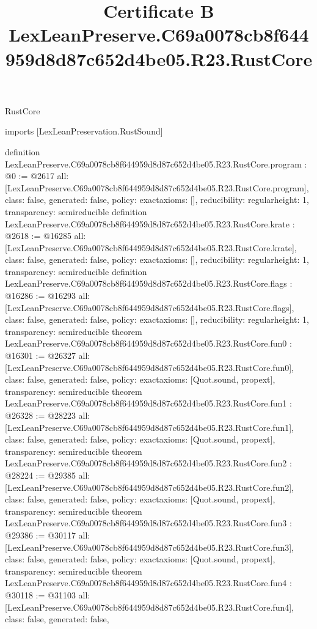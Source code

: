 \begin{lexlean}{RustCore}
\title{Certificate B LexLeanPreserve.C69a0078cb8f644959d8d87c652d4be05.R23.RustCore}
\begin{coremodule}
imports [LexLeanPreservation.RustSound]

definition LexLeanPreserve.C69a0078cb8f644959d8d87c652d4be05.R23.RustCore.program : @0 := @2617 {
  all: [LexLeanPreserve.C69a0078cb8f644959d8d87c652d4be05.R23.RustCore.program],
  class: false,
  generated: false,
  policy: exact{axioms: []},
  reducibility: regular{height: 1},
  transparency: semireducible
}
definition LexLeanPreserve.C69a0078cb8f644959d8d87c652d4be05.R23.RustCore.krate : @2618 := @16285 {
  all: [LexLeanPreserve.C69a0078cb8f644959d8d87c652d4be05.R23.RustCore.krate],
  class: false,
  generated: false,
  policy: exact{axioms: []},
  reducibility: regular{height: 1},
  transparency: semireducible
}
definition LexLeanPreserve.C69a0078cb8f644959d8d87c652d4be05.R23.RustCore.flags : @16286 := @16293 {
  all: [LexLeanPreserve.C69a0078cb8f644959d8d87c652d4be05.R23.RustCore.flags],
  class: false,
  generated: false,
  policy: exact{axioms: []},
  reducibility: regular{height: 1},
  transparency: semireducible
}
theorem LexLeanPreserve.C69a0078cb8f644959d8d87c652d4be05.R23.RustCore.fun0 : @16301 := @26327 {
  all: [LexLeanPreserve.C69a0078cb8f644959d8d87c652d4be05.R23.RustCore.fun0],
  class: false,
  generated: false,
  policy: exact{axioms: [Quot.sound, propext]},
  transparency: semireducible
}
theorem LexLeanPreserve.C69a0078cb8f644959d8d87c652d4be05.R23.RustCore.fun1 : @26328 := @28223 {
  all: [LexLeanPreserve.C69a0078cb8f644959d8d87c652d4be05.R23.RustCore.fun1],
  class: false,
  generated: false,
  policy: exact{axioms: [Quot.sound, propext]},
  transparency: semireducible
}
theorem LexLeanPreserve.C69a0078cb8f644959d8d87c652d4be05.R23.RustCore.fun2 : @28224 := @29385 {
  all: [LexLeanPreserve.C69a0078cb8f644959d8d87c652d4be05.R23.RustCore.fun2],
  class: false,
  generated: false,
  policy: exact{axioms: [Quot.sound, propext]},
  transparency: semireducible
}
theorem LexLeanPreserve.C69a0078cb8f644959d8d87c652d4be05.R23.RustCore.fun3 : @29386 := @30117 {
  all: [LexLeanPreserve.C69a0078cb8f644959d8d87c652d4be05.R23.RustCore.fun3],
  class: false,
  generated: false,
  policy: exact{axioms: [Quot.sound, propext]},
  transparency: semireducible
}
theorem LexLeanPreserve.C69a0078cb8f644959d8d87c652d4be05.R23.RustCore.fun4 : @30118 := @31103 {
  all: [LexLeanPreserve.C69a0078cb8f644959d8d87c652d4be05.R23.RustCore.fun4],
  class: false,
  generated: false,
}
\end{coremodule}
\end{lexlean}

